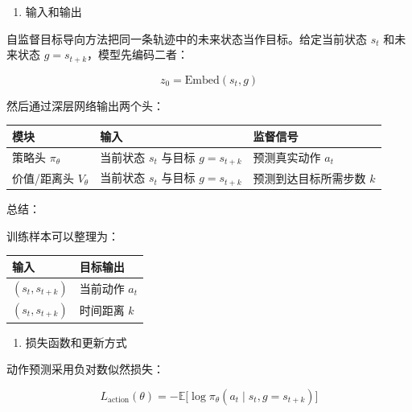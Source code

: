 \begin{enumerate}
\def\labelenumi{\arabic{enumi}.}
\tightlist
\item
  输入和输出
\end{enumerate}

自监督目标导向方法把同一条轨迹中的未来状态当作目标。给定当前状态 \(s_t\) 和未来状态 \(g=s_{t+k}\)，模型先编码二者：

\[
z_0=\mathrm{Embed}(s_t,g)
\]

然后通过深层网络输出两个头：

\begin{longtable}[]{@{}
  >{\raggedright\arraybackslash}p{}
  >{\raggedright\arraybackslash}p{}
  >{\raggedright\arraybackslash}p{}@{}}
\toprule
模块 & 输入 & 监督信号 \\
\midrule
\endhead
策略头 \(\pi_\theta\) & 当前状态 \(s_t\) 与目标 \(g=s_{t+k}\) & 预测真实动作 \(a_t\) \\
价值/距离头 \(V_\theta\) & 当前状态 \(s_t\) 与目标 \(g=s_{t+k}\) & 预测到达目标所需步数 \(k\) \\
\bottomrule
\end{longtable}

总结：

训练样本可以整理为：

\begin{longtable}[]{@{}
  >{\raggedright\arraybackslash}p{}
  >{\raggedright\arraybackslash}p{}@{}}
\toprule
输入 & 目标输出 \\
\midrule
\endhead
\((s_t,s_{t+k})\) & 当前动作 \(a_t\) \\
\((s_t,s_{t+k})\) & 时间距离 \(k\) \\
\bottomrule
\end{longtable}

\begin{enumerate}
\def\labelenumi{\arabic{enumi}.}
\setcounter{enumi}{1}
\tightlist
\item
  损失函数和更新方式
\end{enumerate}

动作预测采用负对数似然损失：

\[
L_{\mathrm{action}}(\theta)
=
-
\mathbb{E}
\bigl[
\log \pi_\theta(a_t\mid s_t,g=s_{t+k})
\bigr]
\]


